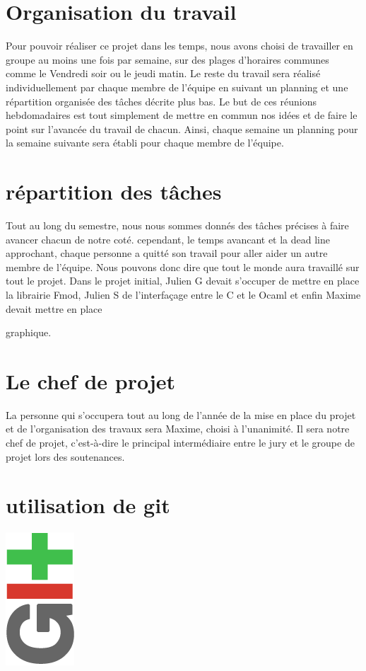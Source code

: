 \documentclass[12pt,a4paper]{report}
\begin{document}
\section{Organisation du travail}

Pour pouvoir réaliser ce projet dans les temps, nous avons choisi de travailler en groupe au moins une fois par semaine, sur des plages d'horaires communes comme le Vendredi soir ou le jeudi matin. Le reste du travail sera réalisé individuellement par chaque membre de l'équipe en suivant un planning et une répartition organisée des tâches décrite plus bas. Le but de ces réunions hebdomadaires est tout simplement de mettre en commun nos idées et de faire le point sur l'avancée du travail de chacun. Ainsi, chaque semaine un planning pour la semaine suivante sera établi pour chaque membre de l'équipe.

\section{répartition des tâches}

Tout au long du semestre, nous nous sommes donnés des tâches précises à faire avancer chacun de notre coté. cependant, le temps avancant et la dead line approchant, chaque personne a quitté son travail pour aller aider un autre membre de l'équipe. Nous pouvons donc dire que tout le monde aura travaillé sur tout le projet.
Dans le projet initial, Julien G devait s'occuper de mettre en place la librairie Fmod, Julien S de l'interfaçage entre le C et le Ocaml et enfin Maxime devait mettre en place 

 graphique.

\section{Le chef de projet}

La personne qui s'occupera tout au long de l'année de la mise en place du projet et de l'organisation des travaux sera Maxime, choisi à l'unanimité. Il sera notre chef de projet, c'est-à-dire le principal intermédiaire entre le jury et le groupe de projet lors des soutenances.

\section{utilisation de git}

\begin{center}
\includegraphics[scale =0.5]{git.png}
\end{center}
\end{document}
